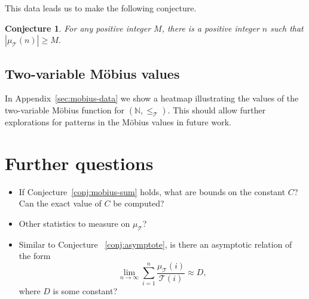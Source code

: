 \documentclass{amsart}
\newtheorem{conj}[thm]{Conjecture}
\theoremstyle{definition}
\newcommand{\NN}{\mathbb{N}}
\newcommand{\Mobius}{M\"obius}
\newcommand{\leqtri}{\leq_{\tri}}
\newcommand{\mutri}{\mu_{\tri}}
\newcommand{\tri}{\mathcal T}
\begin{document}
This data leads us to make the following conjecture.
\begin{conj}
    For any positive integer $M$, there is a positive integer $n$ such that ${|\mutri(n)| \geq M}$.
\end{conj}


\subsection{Two-variable \Mobius{} values}
In Appendix~\ref{sec:mobius-data} %
we show a heatmap illustrating the values of the two-variable \Mobius{} function for $(\NN, \leqtri)$.
This should allow further explorations for patterns in the \Mobius{} values in future work.




\section{Further questions}

\begin{itemize}
    \item 
    If Conjecture~\ref{conj:mobius-sum} holds, what are bounds on the constant $C$?
    Can the exact value of $C$ be computed?
    
    \item 
    Other statistics to measure on $\mutri$?
    
    \item 
    Similar to Conjecture ~\ref{conj:asymptote}, is there an asymptotic relation of the form 
    \begin{equation}
    \lim_{n \to \infty} \sum^n_{i=1} \frac{\mutri (i)}{\tri(i)} \approx D,
    \end{equation}
    where $D$ is some constant?
\end{itemize}
\end{document}
